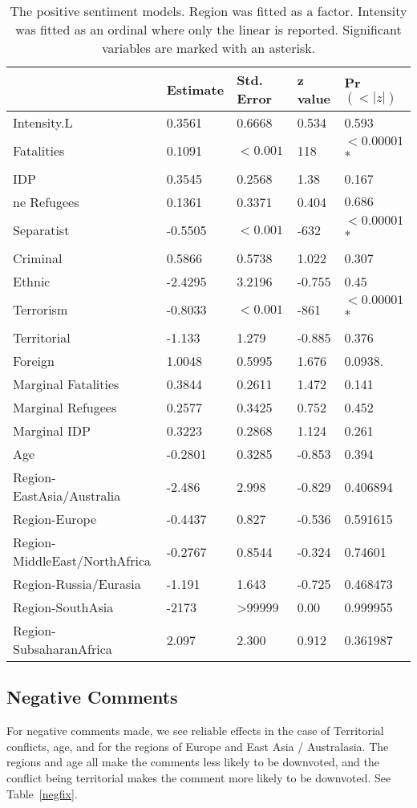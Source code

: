 \begin{table}
\centering
\begin{tabular}{l|llll}
& Estimate & Std. Error & z value & Pr$(<|z|)$  \\ \hline
Intensity.L & 0.3561 & 0.6668 & 0.534 & 0.593 \\ 
Fatalities & 0.1091 &  $<0.001$ & 118 & $<0.00001$* \\ 
IDP & 0.3545 & 0.2568 & 1.38 & 0.167 \\ ne
Refugees & 0.1361 & 0.3371 & 0.404 & $0.686$ \\ 
Separatist & -0.5505 & $<0.001$ & -632 & $<0.00001$* \\ 
Criminal & 0.5866 & 0.5738 & 1.022 & 0.307 \\ 
Ethnic & -2.4295 & 3.2196 & -0.755 & 0.45 \\ 
Terrorism & -0.8033 & $<0.001$ & -861 &  $<0.00001$* \\ 
Territorial & -1.133 & 1.279 & -0.885 & 0.376 \\ 
Foreign & 1.0048 & 0.5995 & 1.676 & 0.0938. \\ 
Marginal Fatalities & 0.3844 & 0.2611 & 1.472 & 0.141 \\ 
Marginal Refugees & 0.2577 & 0.3425 & 0.752 & 0.452 \\ 
Marginal IDP & 0.3223 & 0.2868 & 1.124 & 0.261 \\ 
Age & -0.2801 & 0.3285 & -0.853 & 0.394 \\ 
Region-EastAsia/Australia & -2.486 & 2.998 & -0.829 & 0.406894 \\ 
Region-Europe  & -0.4437 &  0.827 & -0.536 & 0.591615 \\ 
Region-MiddleEast/NorthAfrica & -0.2767 & 0.8544 & -0.324 & 0.74601 \\ 
Region-Russia/Eurasia & -1.191 & 1.643 & -0.725 & 0.468473 \\ 
Region-SouthAsia & -2173 & >99999 & 0.00 & 0.999955 \\ 
Region-SubsaharanAfrica & 2.097 & 2.300 & 0.912 & 0.361987 \\ 
\end{tabular}
\caption{The positive sentiment models. Region was fitted as a factor. Intensity was fitted as an ordinal where only the linear is reported. Significant variables are marked with an asterisk.}
\label{posfix}
\end{table}

\subsection{Negative Comments}
For negative comments made, we see reliable effects in the case of Territorial conflicts, age, and for the regions of Europe and East Asia / Australasia. The regions and age all make the comments less likely to be downvoted, and the conflict being territorial makes the comment more likely to be downvoted. See Table~\ref{negfix}.

